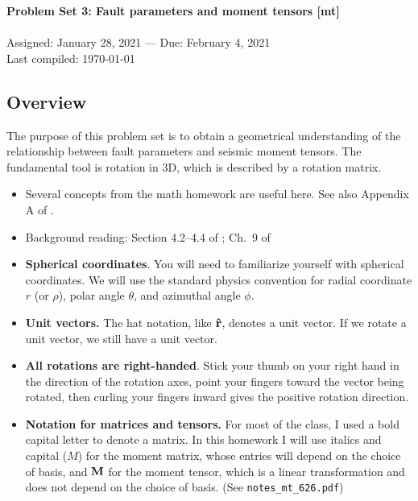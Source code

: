 \documentclass[11pt,titlepage,fleqn]{article}
\begin{document}

\begin{spacing}{1.2}
\centering
{\large \bf Problem Set 3: Fault parameters and moment tensors [mt]} \\
\cltag\ \\
Assigned: January 28, 2021 --- Due: February 4, 2021 \\
Last compiled: \today
\end{spacing}

\begin{spacing}{1.0}

\subsection*{Overview}

The purpose of this problem set is to obtain a geometrical understanding of the relationship between fault parameters and seismic moment tensors. The fundamental tool is rotation in 3D, which is described by a rotation matrix.

\begin{itemize}
\item Several concepts from the math homework are useful here. See also Appendix A of \citet{SteinWysession}.

\item Background reading: Section 4.2--4.4 of \citet{SteinWysession}; Ch.~9 of \citet{ShearerE2}

\item {\bf Spherical coordinates}. You will need to familiarize yourself with spherical coordinates. We will use the standard physics convention for radial coordinate $r$ (or $\rho$), polar angle $\theta$, and azimuthal angle $\phi$.

\item {\bf Unit vectors.} The hat notation, like $\mbox{\boldmath{$\hat{\rm r}$}}$, denotes a unit vector. If we rotate a unit vector, we still have a unit vector.

\item {\bf All rotations are right-handed}. Stick your thumb on your right hand in the direction of the rotation axes, point your fingers toward the vector being rotated, then curling your fingers inward gives the positive rotation direction.

\item {\bf Notation for matrices and tensors.} For most of the class, I used a bold capital letter to denote a matrix. In this homework I will use italics and capital ($M$) for the moment matrix, whose entries will depend on the choice of basis, and $\mbox{${\bf M}$}$ for the moment tensor, which is a linear transformation and does not depend on the choice of basis. (See \verb+notes_mt_626.pdf+)


\end{itemize}
\end{spacing}
\end{document}
